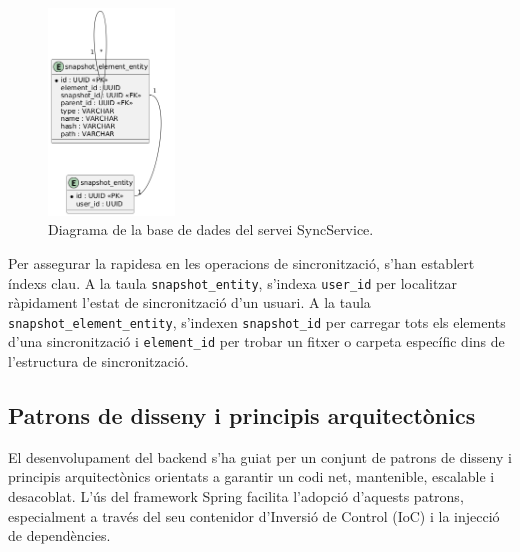 \begin{figure}[H]
    \centering
    \includegraphics[width=0.3\textwidth]{Figures/diagrama_bd_sync.png}
    \caption{Diagrama de la base de dades del servei SyncService.}
    \label{fig:sync_db}
\end{figure}

Per assegurar la rapidesa en les operacions de sincronització, s'han establert índexs clau. A la taula \texttt{snapshot\_entity}, s'indexa \texttt{user\_id} per localitzar ràpidament l'estat de sincronització d'un usuari. A la taula \texttt{snapshot\_element\_entity}, s'indexen \texttt{snapshot\_id} per carregar tots els elements d'una sincronització i \texttt{element\_id} per trobar un fitxer o carpeta específic dins de l'estructura de sincronització.

\subsection{Patrons de disseny i principis arquitectònics}
El desenvolupament del backend s'ha guiat per un conjunt de patrons de disseny i principis arquitectònics orientats a garantir un codi net, mantenible, escalable i desacoblat. L'ús del framework Spring facilita l'adopció d'aquests patrons, especialment a través del seu contenidor d'Inversió de Control (IoC) i la injecció de dependències.

